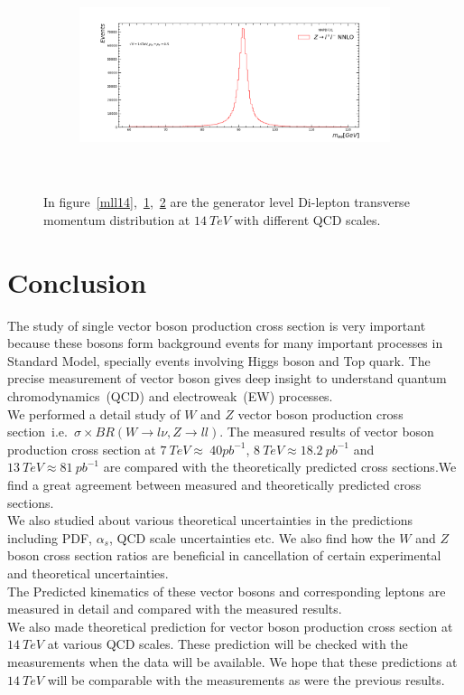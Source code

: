 \begin{figure}[H]
\begin{subfigure}{0.49\textwidth}
\caption{}
\label{mll142}
\end{subfigure}
\begin{subfigure}{0.49\textwidth}
\includegraphics[height=6cm, width=\textwidth]{chapter4/Mll_rf0.5_14.pdf}
\vspace*{-8mm}
\caption{}
\label{mll140}
\end{subfigure}

\caption{In figure~\ref{mll14},~\ref{mll142},~\ref{mll140} are the generator level Di-lepton transverse momentum distribution at $14~TeV$ with different QCD scales.} 
\label{delep1} 
\end{figure}


\chapter*{Conclusion}
The study of single vector boson production cross section is very important because these bosons form background events for many important processes in Standard Model, specially events involving Higgs boson and Top quark. The precise measurement of vector boson gives deep insight to understand quantum chromodynamics~(QCD) and electroweak~(EW) processes.\\
We performed a detail study of $W$ and $Z$ vector boson production cross section~i.e.~$\sigma\times BR(W\rightarrow l\nu, Z\rightarrow ll)$. The measured results of vector boson production cross section at $7~TeV\approx~ 40pb^{-1}$, $8~TeV\approx 18.2~pb^{-1}$ and $13~TeV\approx 81~pb^{-1}$ are compared with the theoretically predicted cross sections.We find a great agreement between measured and theoretically predicted cross sections.\\
We also studied about various theoretical uncertainties in the predictions including PDF, $\alpha_{s}$, QCD scale uncertainties etc. We also find how the $W$ and $Z$ boson cross section ratios are beneficial in cancellation of certain experimental and theoretical uncertainties.\\
The Predicted kinematics of these vector bosons and corresponding leptons are measured in detail and compared with the measured results.\\
We also made theoretical prediction for vector boson production cross section at $14~TeV$ at various QCD scales. These prediction will be checked with the measurements when the data will be available. We hope that these predictions at $14~TeV$ will be comparable with the measurements as were the previous results.






